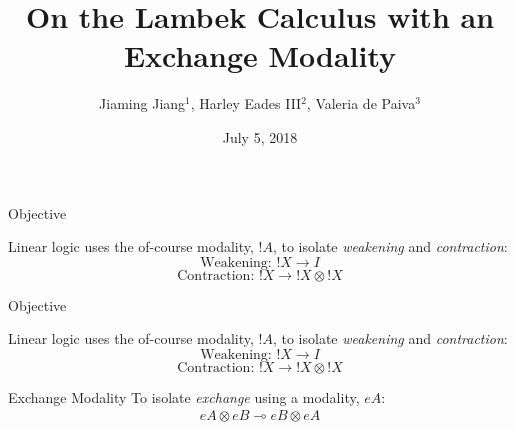 \documentclass{beamer}
\title{On the Lambek Calculus with an Exchange Modality}
\subtitle{}
\date{July 5, 2018}
\author{Jiaming Jiang$^1$, Harley Eades III$^2$, Valeria de Paiva$^3$}
\institute{$^1$North Carolina State University; $^2$Augusta University; $^3$Nuance Communications}
\begin{document}
\maketitle



\begin{frame}{Objective}

Linear logic uses the of-course modality, $!A$, to isolate
\textit{weakening} and \textit{contraction}:
$$\mbox{Weakening: }!X \rightarrow I$$
$$\mbox{Contraction: }!X \rightarrow !X \otimes !X$$


\end{frame}


\begin{frame}{Objective}

Linear logic uses the of-course modality, $!A$, to isolate
\textit{weakening} and \textit{contraction}:
$$\mbox{Weakening: }!X \rightarrow I$$
$$\mbox{Contraction: }!X \rightarrow !X \otimes !X$$

\begin{block}{Exchange Modality}
To isolate \textit{exchange} using a modality, $eA$:
\begin{gather*}
eA\otimes eB\multimap eB\otimes eA
\end{gather*}
\end{block}

\end{frame}
\end{document}
